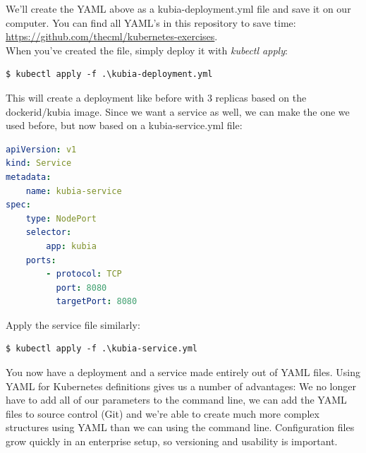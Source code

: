 \documentclass[a4paper,10pt]{article}
\begin{document}
We'll create the YAML above as a kubia-deployment.yml file and save it on our computer. You can find all YAML's in this repository to save time: \url{https://github.com/thecml/kubernetes-exercises}. \\

When you've created the file, simply deploy it with \textit{kubectl apply}:

\begin{lstlisting}[numbers=none, basicstyle=\mdseries]
$ kubectl apply -f .\kubia-deployment.yml
\end{lstlisting}

This will create a deployment like before with 3 replicas based on the dockerid/kubia image. Since we want a service as well, we can make the one we used before, but now based on a kubia-service.yml file:

\begin{lstlisting}[language=yaml, numbers=none, frame=single]
apiVersion: v1
kind: Service
metadata:
	name: kubia-service
spec:
	type: NodePort
	selector:
		app: kubia
	ports:
		- protocol: TCP
		  port: 8080
		  targetPort: 8080
\end{lstlisting}

Apply the service file similarly:

\begin{lstlisting}[numbers=none, basicstyle=\mdseries]
$ kubectl apply -f .\kubia-service.yml
\end{lstlisting}

You now have a deployment and a service made entirely out of YAML files. Using YAML for Kubernetes definitions gives us a number of advantages: We no longer have to add all of our parameters to the command line, we can add the YAML files to source control (Git) and we're able to create much more complex structures using YAML than we can using the command line. Configuration files grow quickly in an enterprise setup, so versioning and usability is important.
\end{document}
